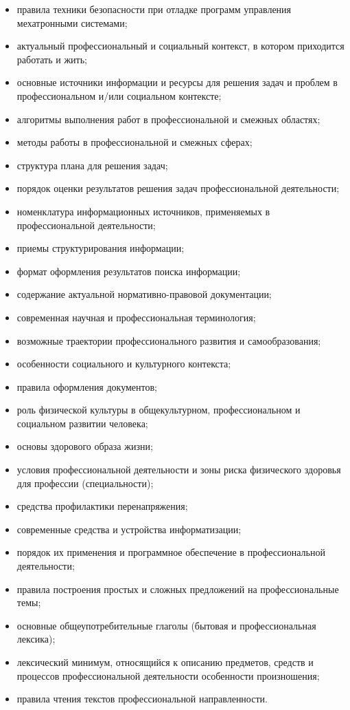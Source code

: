 \begin{itemize}
    \item правила техники безопасности при отладке программ управления мехатронными системами;
    \item актуальный профессиональный и социальный контекст, в котором приходится работать и жить;
    \item основные источники информации и ресурсы для решения задач и проблем в профессиональном и/или социальном контексте;
    \item алгоритмы выполнения работ в профессиональной и смежных областях;
    \item методы работы в профессиональной и смежных сферах;
    \item структура плана для решения задач;
    \item порядок оценки результатов решения задач профессиональной деятельности;
    \item номенклатура информационных источников, применяемых в профессиональной деятельности;
    \item приемы структурирования информации;
    \item формат оформления результатов поиска информации;
    \item содержание актуальной нормативно-правовой документации;
    \item современная научная и профессиональная терминология;
    \item возможные траектории профессионального развития и самообразования;
    \item особенности социального и культурного контекста;
    \item правила оформления документов;
    \item роль физической культуры в общекультурном, профессиональном и социальном развитии человека;
    \item основы здорового образа жизни;
    \item условия профессиональной деятельности и зоны риска физического здоровья для профессии (специальности);
    \item средства профилактики перенапряжения;
    \item современные средства и устройства информатизации;
    \item порядок их применения и программное обеспечение в профессиональной деятельности;
    \item правила построения простых и сложных предложений на профессиональные темы;
    \item основные общеупотребительные глаголы (бытовая и профессиональная лексика);
    \item лексический минимум, относящийся к описанию предметов, средств и процессов профессиональной деятельности особенности произношения;
    \item правила чтения текстов профессиональной направленности.
\end{itemize}